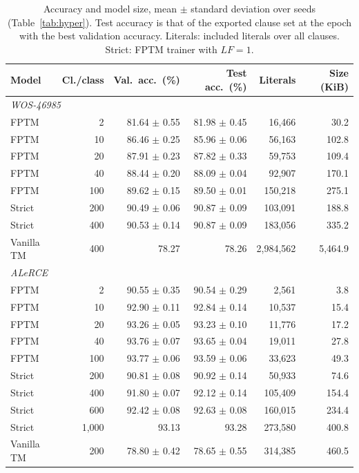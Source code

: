 \documentclass[preprint,review,12pt]{elsarticle}
\newcommand{\LF}{\mathit{LF}}
\begin{document}
\begin{table}[!htbp]
\small
\centering
\caption{Accuracy and model size, mean $\pm$ standard deviation over seeds (Table~\ref{tab:hyper}). Test accuracy is that of the exported clause set at the epoch with the best validation accuracy. Literals: included literals over all clauses. Strict: FPTM trainer with $\LF=1$.}
\label{tab:accuracy}
\begin{tabular}{lrrrrr}
\toprule
Model & Cl./class & Val.\ acc.\ (\%) & Test acc.\ (\%) & Literals & Size (KiB) \\
\midrule
\multicolumn{6}{l}{\textit{WOS-46985}} \\
FPTM & 2 & 81.64 $\pm$ 0.55 & 81.98 $\pm$ 0.45 & 16,466 & 30.2 \\
FPTM & 10 & 86.46 $\pm$ 0.25 & 85.96 $\pm$ 0.06 & 56,163 & 102.8 \\
FPTM & 20 & 87.91 $\pm$ 0.23 & 87.82 $\pm$ 0.33 & 59,753 & 109.4 \\
FPTM & 40 & 88.44 $\pm$ 0.20 & 88.09 $\pm$ 0.04 & 92,907 & 170.1 \\
FPTM & 100 & 89.62 $\pm$ 0.15 & 89.50 $\pm$ 0.01 & 150,218 & 275.1 \\
Strict & 200 & 90.49 $\pm$ 0.06 & 90.87 $\pm$ 0.09 & 103,091 & 188.8 \\
Strict & 400 & 90.53 $\pm$ 0.14 & 90.87 $\pm$ 0.09 & 183,056 & 335.2 \\
Vanilla TM & 400 & 78.27 & 78.26 & 2,984,562 & 5,464.9 \\
\midrule
\multicolumn{6}{l}{\textit{ALeRCE}} \\
FPTM & 2 & 90.55 $\pm$ 0.35 & 90.54 $\pm$ 0.29 & 2,561 & 3.8 \\
FPTM & 10 & 92.90 $\pm$ 0.11 & 92.84 $\pm$ 0.14 & 10,537 & 15.4 \\
FPTM & 20 & 93.26 $\pm$ 0.05 & 93.23 $\pm$ 0.10 & 11,776 & 17.2 \\
FPTM & 40 & 93.76 $\pm$ 0.07 & 93.65 $\pm$ 0.04 & 19,011 & 27.8 \\
FPTM & 100 & 93.77 $\pm$ 0.06 & 93.59 $\pm$ 0.06 & 33,623 & 49.3 \\
Strict & 200 & 90.81 $\pm$ 0.08 & 90.92 $\pm$ 0.14 & 50,933 & 74.6 \\
Strict & 400 & 91.80 $\pm$ 0.07 & 92.12 $\pm$ 0.14 & 105,409 & 154.4 \\
Strict & 600 & 92.42 $\pm$ 0.08 & 92.63 $\pm$ 0.08 & 160,015 & 234.4 \\
Strict & 1,000 & 93.13 & 93.28 & 273,580 & 400.8 \\
Vanilla TM & 200 & 78.80 $\pm$ 0.42 & 78.65 $\pm$ 0.55 & 314,385 & 460.5 \\

\end{tabular}
\end{table}
\end{document}
